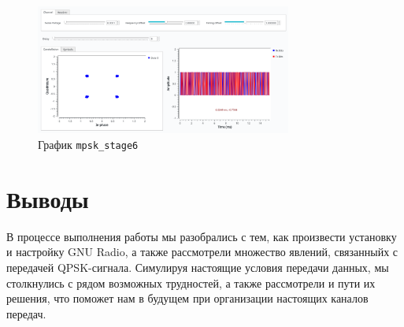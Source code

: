 \documentclass[a4paper,12pt]{report}
\begin{document}
    \begin{figure}[H]
        \centering
        \includegraphics[width=0.75\textwidth]{images/mpsk_stage6_plot.png}
        \caption{График \texttt{mpsk\_stage6}}
        \label{fig:mpsk_stage6_plot}
    \end{figure}
    
    \chapter{Выводы}
    
    В процессе выполнения работы мы разобрались с тем, как произвести установку и настройку GNU Radio, а также рассмотрели множество явлений, связанныйх с передачей QPSK-сигнала. Симулируя настоящие условия передачи данных, мы столкнулись с рядом возможных трудностей, а также рассмотрели и пути их решения, что поможет нам в будущем при организации настоящих каналов передач.

    \printbibliography
    
\end{document}
